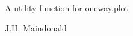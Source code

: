 \begin{Description}\relax
A utility function for oneway.plot
\end{Description}
\begin{Author}\relax
J.H. Maindonald
\end{Author}

